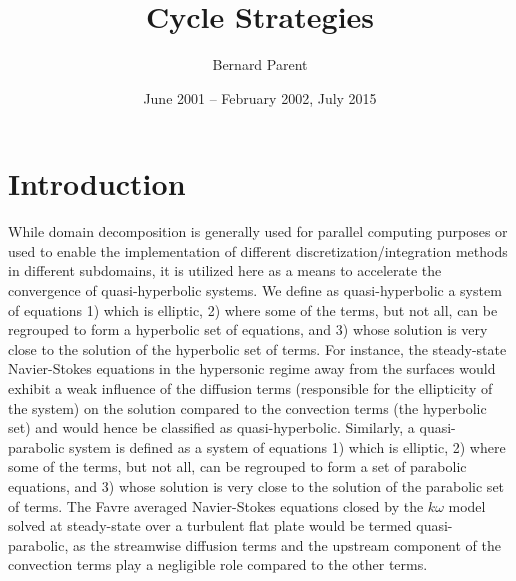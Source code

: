 \documentclass{warpdoc}
\author{
  Bernard Parent
}
\title{
  Cycle Strategies
}
\date{
  June 2001 -- February 2002, July 2015
}
\begin{document}
  \pagestyle{headings}
  \setcounter{page}{1}
  \makewarpdoctitle
  \tableofcontents





\section{Introduction}


While domain decomposition is generally used for parallel computing purposes
or used to enable the implementation of different discretization/integration
methods in different subdomains, it is utilized here as a means to accelerate
the convergence of quasi-hyperbolic systems. We define as quasi-hyperbolic
a system of equations 1) which is elliptic,
2) where some of the terms, but not all, can be regrouped to
form a hyperbolic set of equations, and 3) whose solution is very close to
the solution of the hyperbolic set of terms.
For instance, the steady-state Navier-Stokes equations in the hypersonic
regime away from the surfaces would exhibit a weak influence of the
diffusion terms (responsible for the ellipticity of the system)
on the solution compared to the
convection terms (the hyperbolic set) and would hence be classified as
quasi-hyperbolic.
Similarly, a quasi-parabolic system is defined as a system of equations
1) which is elliptic, 2) where some of the terms, but not all, can
be regrouped to form a set of parabolic equations, and 3) whose solution is
very close to the solution of the parabolic set of terms.
The Favre averaged Navier-Stokes equations closed by the $k\omega$ model
solved at steady-state over a turbulent
flat plate would be termed quasi-parabolic, as the streamwise diffusion terms
and the upstream component of the convection terms play a negligible role
compared to the other terms.
%
\end{document}
